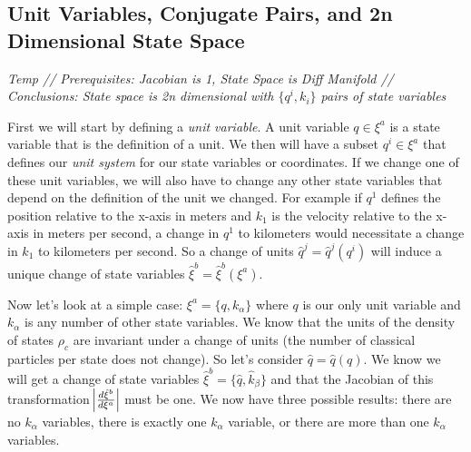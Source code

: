 \documentclass{article}
\begin{document}
\subsection{Unit Variables, Conjugate Pairs, and 2n Dimensional State Space}
\textsl{Temp // Prerequisites: Jacobian is 1, State Space is Diff Manifold // Conclusions: State space is 2n dimensional with $\{q^i,k_i\}$ pairs of state variables}

	First we will start by defining a \textit{unit variable}. A unit variable $q \in \xi^a$ is a state variable that is the definition of a unit. We then will have a subset $q^i \in \xi^a$ that defines our \textit{unit system} for our state variables or coordinates. If we change one of these unit variables, we will also have to change any other state variables that depend on the definition of the unit we changed. For example if $q^1$ defines the position relative to the x-axis in meters and $k_1$ is the velocity relative to the x-axis in meters per second, a change in $q^1$ to kilometers would necessitate a change in $k_1$ to kilometers per second. So a change of units $\hat{q}^j = \hat{q}^j(q^i)$ will induce a unique change of state variables $\hat{\xi}^b = \hat{\xi}^b(\xi^a)$.
	
	Now let's look at a simple case: $\xi^a = \{q,k_\alpha\}$ where $q$ is our only unit variable and $k_\alpha$ is any number of other state variables. We know that the units of the density of states $\rho_c$ are invariant under a change of units (the number of classical particles per state does not change). So let's consider $\hat{q} = \hat{q}(q)$. We know we will get a change of state variables $\hat{\xi}^b = \{\hat{q},\hat{k}_\beta\}$ and that the Jacobian of this transformation $\abs{\frac{d\hat{\xi}^b}{d\xi^a}}$ must be one. We now have three possible results: there are no $k_\alpha$ variables, there is exactly one $k_\alpha$ variable, or there are more than one $k_\alpha$ variables.
	
\end{document}
